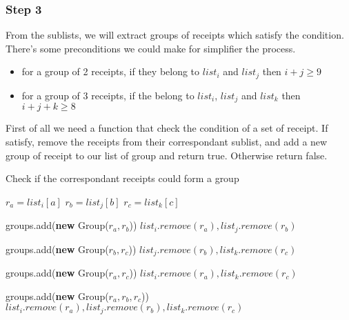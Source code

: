 \subsubsection{Step 3}
From the sublists, we will extract groups of receipts which satisfy the condition. There's some preconditions we could make for simplifier the process.

\begin{itemize}
\item for a group of 2 receipts, if they belong to $list_{i}$ and $list_{j}$ then $i+j \geq 9$
\item for a group of 3 receipts, if the belong to $list_{i}$, $list_{j}$ and $list_{k}$ then $i+j+k \geq 8$
\end{itemize}


First of all we need a function that check the condition of a set of receipt. If satisfy, remove the receipts from their correspondant sublist, and add a new group of receipt to our list of group and return true. Otherwise return false.

\begin{algorithm}[H]
\caption{Check if the correspondant receipts could form a group}
\begin{algorithmic}[1]

\State $r_{a} = list_{i}[a]$
\State $r_{b} = list_{j}[b]$
\State $r_{c} = list_{k}[c]$

	\State groups.add(\textbf{new} Group($r_a, r_b$))
	\State $list_i.remove(r_a), list_j.remove(r_b)$
	\State {}
\EndIf

	\State groups.add(\textbf{new} Group($r_b, r_c$))
	\State $list_j.remove(r_b), list_k.remove(r_c)$
	\State {}
\EndIf

	\State groups.add(\textbf{new} Group($r_a, r_c$))
	\State $list_i.remove(r_a), list_k.remove(r_c)$
	\State {}
\EndIf

	\State groups.add(\textbf{new} Group($r_a, r_b, r_c$))
	\State $list_i.remove(r_a), list_j.remove(r_b), list_k.remove(r_c)$
	\State {}
\EndIf

\EndFunction
\end{algorithmic}
\end{algorithm}

